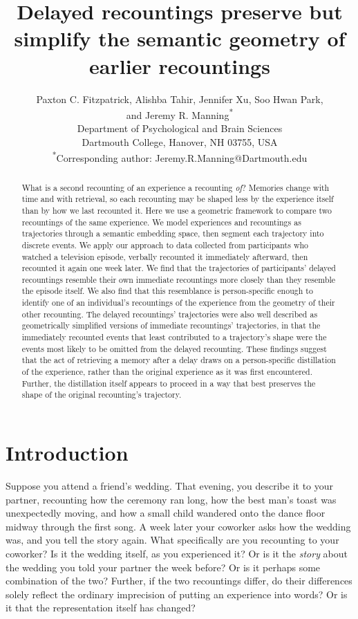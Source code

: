 \documentclass[10pt]{article}
\title{\vspace{-2em}Delayed recountings preserve but simplify the semantic geometry of earlier recountings}
\author{Paxton C. Fitzpatrick, Alishba Tahir, Jennifer Xu, Soo Hwan Park,\\and Jeremy R. Manning\textsuperscript{*}\\
\vspace{-0.5em}\small{Department of Psychological and Brain Sciences}\\
\small{Dartmouth College, Hanover, NH 03755, USA}\\
\vspace{-0.5em}\small{\textsuperscript{*}Corresponding author: Jeremy.R.Manning@Dartmouth.edu}}
\date{}
\begin{document}
\maketitle

\begin{abstract}\noindent
What is a second recounting of an experience a recounting \textit{of}?
Memories change with time and with retrieval, so each recounting may be shaped less by the experience itself than by how we last recounted it.
Here we use a geometric framework to compare two recountings of the same experience.
We model experiences and recountings as trajectories through a semantic embedding space, then segment each trajectory into discrete events.
We apply our approach to data collected from participants who watched a television episode, verbally recounted it immediately afterward, then recounted it again one week later.
We find that the trajectories of participants' delayed recountings resemble their own immediate recountings more closely than they resemble the episode itself.
We also find that this resemblance is person-specific enough to identify one of an individual's recountings of the experience from the geometry of their other recounting.
The delayed recountings' trajectories were also well described as geometrically simplified versions of immediate recountings' trajectories, in that the immediately recounted events that least contributed to a trajectory's shape were the events most likely to be omitted from the delayed recounting.
These findings suggest that the act of retrieving a memory after a delay draws on a person-specific distillation of the experience, rather than the original experience as it was first encountered.
Further, the distillation itself appears to proceed in a way that best preserves the shape of the original recounting's trajectory.
\end{abstract}


\section*{Introduction}

Suppose you attend a friend's wedding.
That evening, you describe it to your partner, recounting how the ceremony ran long, how the best man's toast was unexpectedly moving, and how a small child wandered onto the dance floor midway through the first song.
A week later your coworker asks how the wedding was, and you tell the story again.
What specifically are you recounting to your coworker?
Is it the wedding itself, as you experienced it?
Or is it the \textit{story} about the wedding you told your partner the week before?
Or is it perhaps some combination of the two?
Further, if the two recountings differ, do their differences solely reflect the ordinary imprecision of putting an experience into words?
Or is it that the representation itself has changed?
\end{document}
